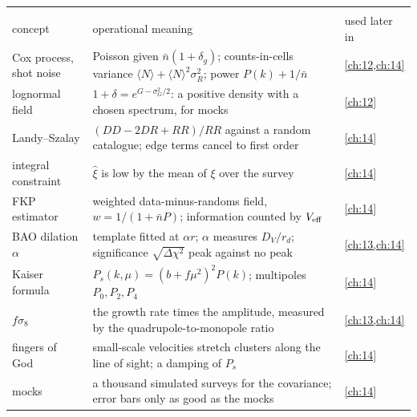 \begin{center}
\small
\renewcommand{\arraystretch}{1.15}
\begin{tabularx}{\linewidth}{@{}>{\raggedright\arraybackslash}p{3.3cm}
                               >{\raggedright\arraybackslash}X
                               >{\raggedright\arraybackslash}p{2.0cm}@{}}
\toprule
\multicolumn{3}{@{}l}{\textbf{Clustering of galaxies}}\\
concept & operational meaning & used later in\\\midrule
Cox process, shot noise & Poisson given $\bar n(1+\delta_g)$; counts-in-cells variance $\langle N\rangle+\langle N\rangle^2\sigma_R^2$; power $P(k)+1/\bar n$ & \cref{ch:12,ch:14}\\
lognormal field & $1+\delta=e^{G-\sigma_G^2/2}$: a positive density with a chosen spectrum, for mocks & \cref{ch:12}\\
Landy--Szalay & $(DD-2DR+RR)/RR$ against a random catalogue; edge terms cancel to first order & \cref{ch:14}\\
integral constraint & $\hat\xi$ is low by the mean of $\xi$ over the survey & \cref{ch:14}\\
FKP estimator & weighted data-minus-randoms field, $w=1/(1+\bar nP)$; information counted by $V_{\rm eff}$ & \cref{ch:14}\\
BAO dilation $\alpha$ & template fitted at $\alpha r$; $\alpha$ measures $D_V/r_d$; significance $\sqrt{\Delta\chi^2}$ peak against no peak & \cref{ch:13,ch:14}\\
Kaiser formula & $P_s(k,\mu)=(b+f\mu^2)^2P(k)$; multipoles $P_0,P_2,P_4$ & \cref{ch:14}\\
$f\sigma_8$ & the growth rate times the amplitude, measured by the quadrupole-to-monopole ratio & \cref{ch:13,ch:14}\\
fingers of God & small-scale velocities stretch clusters along the line of sight; a damping of $P_s$ & \cref{ch:14}\\
mocks & a thousand simulated surveys for the covariance; error bars only as good as the mocks & \cref{ch:14}\\
\bottomrule
\end{tabularx}
\end{center}

